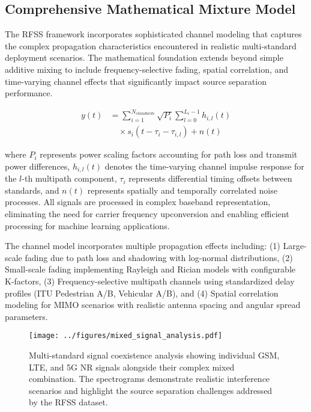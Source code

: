\documentclass[twocolumn]{article}
\begin{document}
\subsection{Comprehensive Mathematical Mixture Model}

The RFSS framework incorporates sophisticated channel modeling that captures the complex propagation characteristics encountered in realistic multi-standard deployment scenarios. The mathematical foundation extends beyond simple additive mixing to include frequency-selective fading, spatial correlation, and time-varying channel effects that significantly impact source separation performance.

\begin{align}
y(t) &= \sum_{i=1}^{N_{standards}} \sqrt{P_i} \sum_{l=0}^{L_i-1} h_{i,l}(t) \nonumber \\
&\quad \times s_i(t-\tau_i-\tau_{i,l}) + n(t)
\end{align}

where $P_i$ represents power scaling factors accounting for path loss and transmit power differences, $h_{i,l}(t)$ denotes the time-varying channel impulse response for the $l$-th multipath component, $\tau_i$ represents differential timing offsets between standards, and $n(t)$ represents spatially and temporally correlated noise processes. All signals are processed in complex baseband representation, eliminating the need for carrier frequency upconversion and enabling efficient processing for machine learning applications.

The channel model incorporates multiple propagation effects including: (1) Large-scale fading due to path loss and shadowing with log-normal distributions, (2) Small-scale fading implementing Rayleigh and Rician models with configurable K-factors, (3) Frequency-selective multipath channels using standardized delay profiles (ITU Pedestrian A/B, Vehicular A/B), and (4) Spatial correlation modeling for MIMO scenarios with realistic antenna spacing and angular spread parameters.

\begin{figure*}[t]
\centering
\texttt{[image: ../figures/mixed\_signal\_analysis.pdf]}
\caption{Multi-standard signal coexistence analysis showing individual GSM, LTE, and 5G NR signals alongside their complex mixed combination. The spectrograms demonstrate realistic interference scenarios and highlight the source separation challenges addressed by the RFSS dataset.}
\label{fig:spectrograms}
\end{figure*}
\end{document}
